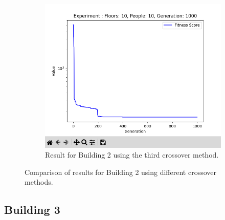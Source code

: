 \begin{figure}[h]
\begin{subfigure}[b]{0.32\linewidth}
		\label{fig:results/B2_Co2}
	\end{subfigure}
	\hfill
	\begin{subfigure}[b]{0.32\linewidth}
		\centering
		\includegraphics[width=\linewidth]{results/B2_Co3.png}
		\caption{Result for Building 2 using the third crossover method.}
		\label{fig:results/B2_Co3}
	\end{subfigure}
	\caption{Comparison of results for Building 2 using different crossover methods.}
	\label{fig:results/B2_comparison}
\end{figure}
\subsection{Building 3}
